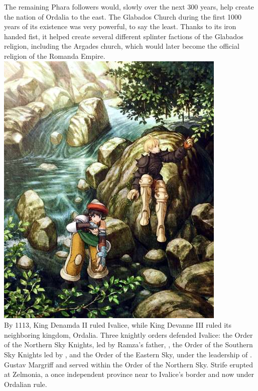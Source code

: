 The remaining Phara followers would, slowly over the next 300 years, help create the nation of Ordalia to the east.
The Glabados Church during the first 1000 years of its existence was very powerful, to say the least.
Thanks to its iron handed fist, it helped create several different splinter factions of the Glabados religion, including the Argades church, which would later become the official religion of the Romanda Empire.
%
\ofpar
\includegraphics[width=\columnwidth]{./art/worldbook/luso.jpg}
\ofpar
%
\\
By 1113, King Denamda II ruled Ivalice, while King Devanne III ruled its neighboring kingdom, Ordalia. 
Three knightly orders defended Ivalice: the Order of the Northern Sky Knights, led by Ramza's father, , the Order of the Southern Sky Knights led by , and the Order of the Eastern Sky, under the leadership of . 
Gustav Margriff and  served within the Order of the Northern Sky.
Strife erupted at Zelmonia, a once independent province near to Ivalice's border and now under Ordalian rule. 
